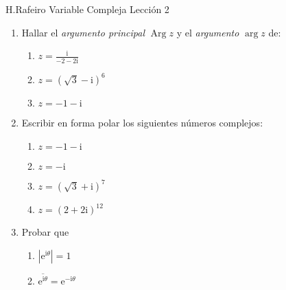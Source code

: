 \documentclass[12pt]{article}
\newcommand{\ii}{\mathrm i}
\newcommand{\ee}{\mathrm e}
\DeclareMathOperator{\Arg}{Arg}
\begin{document}
\noindent H.Rafeiro \hfill Variable Compleja \hfill Lección 2

\begin{enumerate}
	\item Hallar el \textit{argumento principal} $\Arg z$  y el \textit{argumento} $\arg z$ de: 
		\begin{enumerate}
			\item $z= \frac{\ii}{-2-2\ii}$
			\item $z= \left( \sqrt{3}-\ii \right)^6$
			\item $z=-1-\ii$
		\end{enumerate}

	\item Escribir en forma polar los siguientes números complejos:
		\begin{enumerate}
			\item $z= -1-\ii$
			\item $z= -\ii$
			\item $z=\left(\sqrt{ 3}+\ii\right)^7 $ 
			\item $z= \left( 2+2\ii \right)^{12}$
		\end{enumerate}
	\item Probar que
		\begin{enumerate}
		\item $|\ee^{\ii\theta}|=1$
		\item $\overline{\ee^{ \ii\theta}}= \ee^{-\ii \theta}$

		\end{enumerate}
\end{enumerate}
\end{document}
